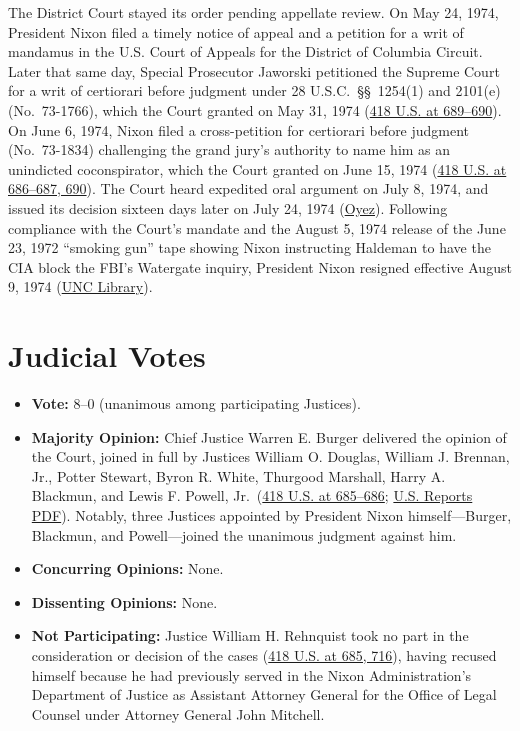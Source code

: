 \documentclass[12pt]{article}
\begin{document}
The District Court stayed its order pending appellate review. On May 24, 1974, President Nixon filed a timely notice of appeal and a petition for a writ of mandamus in the U.S. Court of Appeals for the District of Columbia Circuit. Later that same day, Special Prosecutor Jaworski petitioned the Supreme Court for a writ of certiorari before judgment under 28 U.S.C.\ \S\S\ 1254(1) and 2101(e) (No.\ 73-1766), which the Court granted on May 31, 1974 (\href{https://supreme.justia.com/cases/federal/us/418/683/}{418 U.S. at 689--690}). On June 6, 1974, Nixon filed a cross-petition for certiorari before judgment (No.\ 73-1834) challenging the grand jury's authority to name him as an unindicted coconspirator, which the Court granted on June 15, 1974 (\href{https://supreme.justia.com/cases/federal/us/418/683/}{418 U.S. at 686--687, 690}). The Court heard expedited oral argument on July 8, 1974, and issued its decision sixteen days later on July 24, 1974 (\href{https://www.oyez.org/cases/1973/73-1766}{Oyez}). Following compliance with the Court's mandate and the August 5, 1974 release of the June 23, 1972 ``smoking gun'' tape showing Nixon instructing Haldeman to have the CIA block the FBI's Watergate inquiry, President Nixon resigned effective August 9, 1974 (\href{https://exhibits.lib.unc.edu/exhibits/show/watergate/timeline}{UNC Library}).

\section{Judicial Votes}

\begin{itemize}
\item \textbf{Vote:} 8--0 (unanimous among participating Justices).
\item \textbf{Majority Opinion:} Chief Justice Warren E. Burger delivered the opinion of the Court, joined in full by Justices William O. Douglas, William J. Brennan, Jr., Potter Stewart, Byron R. White, Thurgood Marshall, Harry A. Blackmun, and Lewis F. Powell, Jr.\ (\href{https://supreme.justia.com/cases/federal/us/418/683/}{418 U.S. at 685--686}; \href{https://tile.loc.gov/storage-services/service/ll/usrep/usrep418/usrep418683/usrep418683.pdf}{U.S. Reports PDF}). Notably, three Justices appointed by President Nixon himself---Burger, Blackmun, and Powell---joined the unanimous judgment against him.
\item \textbf{Concurring Opinions:} None.
\item \textbf{Dissenting Opinions:} None.
\item \textbf{Not Participating:} Justice William H. Rehnquist took no part in the consideration or decision of the cases (\href{https://supreme.justia.com/cases/federal/us/418/683/}{418 U.S. at 685, 716}), having recused himself because he had previously served in the Nixon Administration's Department of Justice as Assistant Attorney General for the Office of Legal Counsel under Attorney General John Mitchell.
\end{itemize}
\end{document}
